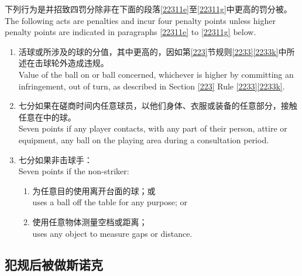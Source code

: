\noindent 下列行为是\termpenalty{}并招致四罚分除非在下面的段落\ref{22311e}至\ref{22311g}中更高的罚分被\indicate{}。\\
The following acts are penalties and incur four penalty points unless higher penalty points are indicated in paragraphs \ref{22311e} to \ref{22311g} below.
\begin{enumerate}[label=(\alph*),start=5]
    \item \label{22311e}活球或所涉及的球的分值，其中更高的，因如第\ref{223}节规则\ref{2233}\ref{2233k}中所述在击球轮外造成违规。\\
    Value of the ball on or ball concerned, whichever is higher by committing an infringement, out of turn, as described in Section \ref{223} Rule \ref{2233}\ref{2233k}.
    \item 七分如果在磋商时间内任意球员，以他们身体、衣服或装备的任意部分，接触任意在\playingarea{}中的球。\\
    Seven points if any player contacts, with any part of their person, attire or equipment, any ball on the playing area during a consultation period.
    \item \label{22311g}七分如果非击球手：\\
    Seven points if the non-striker:
    \begin{enumerate}[label=(\roman*)]
        \item 为任意目的使用离开台面的球；或\\
        uses a ball off the table for any purpose; or
        \item 使用任意物体测量空档或距离；\\
        uses any object to measure gaps or distance.
    \end{enumerate}
\end{enumerate}

\subsection{犯规后被做斯诺克}\label{22312}

